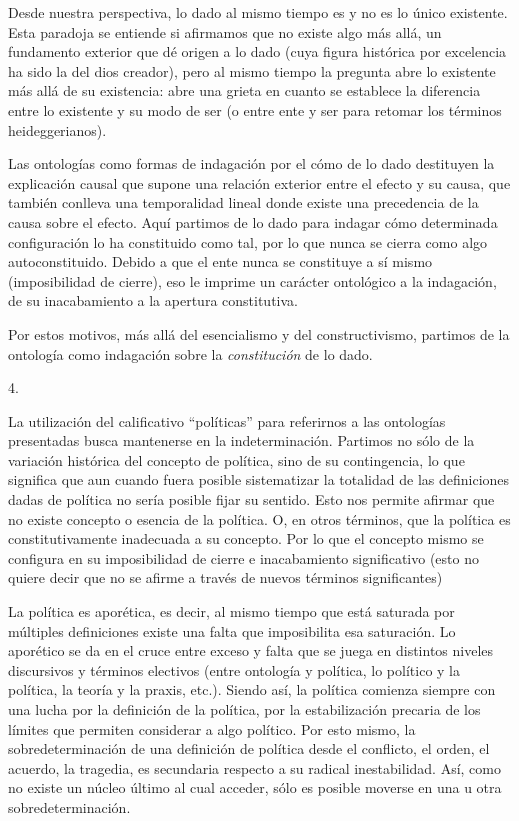 Desde nuestra perspectiva, lo dado al mismo tiempo es y no es lo único existente. Esta paradoja se entiende si afirmamos que no existe algo más allá, un fundamento exterior que dé origen a lo dado (cuya figura histórica por excelencia ha sido la del dios creador), pero al mismo tiempo la pregunta abre lo existente más allá de su existencia: abre una grieta en cuanto se establece la diferencia entre lo existente y su modo de ser (o entre ente y ser para retomar los términos heideggerianos).

Las ontologías como formas de indagación por el cómo de lo dado destituyen la explicación causal que supone una relación exterior entre el efecto y su causa, que también conlleva una temporalidad lineal donde existe una precedencia de la causa sobre el efecto. Aquí partimos de lo dado para indagar cómo determinada configuración lo ha constituido como tal, por lo que nunca se cierra como algo autoconstituido. Debido a que el ente nunca se constituye a sí mismo (imposibilidad de cierre), eso le imprime un carácter ontológico a la indagación, de su inacabamiento a la apertura constitutiva.

Por estos motivos, más allá del esencialismo y del constructivismo, partimos de la ontología como indagación sobre la \emph{constitución} de lo dado.

4.

La utilización del calificativo \enquote{políticas} para referirnos a las ontologías presentadas busca mantenerse en la indeterminación. Partimos no sólo de la variación histórica del concepto de política, sino de su contingencia, lo que significa que aun cuando fuera posible sistematizar la totalidad de las definiciones dadas de política no sería posible fijar su sentido. Esto nos permite afirmar que no existe concepto o esencia de la política. O, en otros términos, que la política es constitutivamente inadecuada a su concepto. Por lo que el concepto mismo se configura en su imposibilidad de cierre e inacabamiento significativo (esto no quiere decir que no se afirme a través de nuevos términos significantes)

La política es aporética, es decir, al mismo tiempo que está saturada por múltiples definiciones existe una falta que imposibilita esa saturación. Lo aporético se da en el cruce entre exceso y falta que se juega en distintos niveles discursivos y términos electivos (entre ontología y política, lo político y la política, la teoría y la praxis, etc.). Siendo así, la política comienza siempre con una lucha por la definición de la política, por la estabilización precaria de los límites que permiten considerar a algo político. Por esto mismo, la sobredeterminación de una definición de política desde el conflicto, el orden, el acuerdo, la tragedia, es secundaria respecto a su radical inestabilidad. Así, como no existe un núcleo último al cual acceder, sólo es posible moverse en una u otra sobredeterminación.

